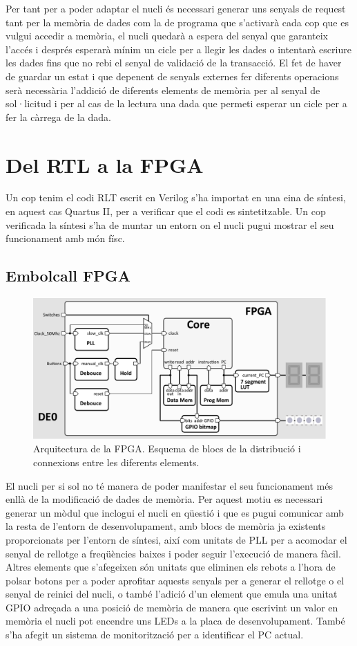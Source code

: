 \documentclass[10pt,a4paper,twocolumn,twoside]{article}
\begin{document}
    Per tant per a poder adaptar el nucli és necessari generar uns senyals de request tant per la memòria de dades com la de programa que s'activarà cada cop que es vulgui accedir a memòria, el nucli quedarà a espera del senyal que garanteix l'accés i després esperarà mínim un cicle per a llegir les dades o intentarà escriure les dades fins que no rebi el senyal de validació de la transacció.
    El fet de haver de guardar un estat i que depenent de senyals externes fer diferents operacions serà necessària l'addició de diferents elements de memòria per al senyal de sol·licitud i per al cas de la lectura una dada que permeti esperar un cicle per a fer la càrrega de la dada.
        
        
\section{Del RTL a la FPGA}  %
Un cop tenim el codi RLT escrit en Verilog s'ha importat en una eina de síntesi, en aquest cas Quartus II, per a verificar que el codi es sintetitzable. Un cop verificada la síntesi s'ha de muntar un entorn on el nucli pugui mostrar el seu funcionament amb món físc.
    \subsection{Embolcall FPGA}
        \begin{figure}[!ht]
    \centering
    	\includegraphics[width=0.9\linewidth]{pdf/arch_FPGA.pdf}
        \caption{Arquitectura de la FPGA. Esquema de blocs de la distribució i connexions entre les diferents elements.}
        \label{fig:FPGA_arch}
    \end{figure}
    
    El nucli per si sol no té manera de poder manifestar el seu funcionament més enllà de la modificació de dades de memòria. Per aquest motiu es necessari generar un mòdul que inclogui el nucli en qüestió i que es pugui comunicar amb la resta de l'entorn de desenvolupament, amb blocs de memòria ja existents proporcionats per l'entorn de síntesi, així com unitats de PLL per a acomodar el senyal de rellotge a freqüències baixes i poder seguir l'execució de manera fàcil. Altres elements que s'afegeixen són unitats que eliminen els rebots a l'hora de polsar botons per a poder aprofitar aquests senyals per a generar el rellotge o el senyal de reinici del nucli, o també l'adició d'un element que emula una unitat GPIO adreçada a una posició de memòria de manera que escrivint un valor en memòria el nucli pot encendre uns LEDs a la placa de desenvolupament. També s'ha afegit un sistema de monitorització per a identificar el PC actual.
    
\end{document}
